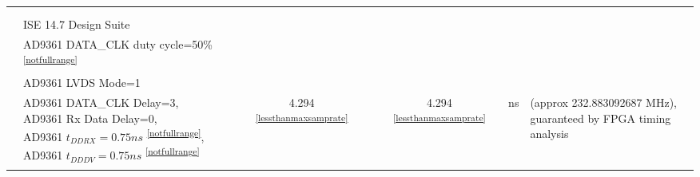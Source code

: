 \documentclass{article}
\begin{document}
\begin{scriptsize}
\begin{longtable}{|c|l|c|c|c|c|l|}
\\
                          &                                      &                                & &                                &                      & \\
                          &                                      &                                & &                                &                      & \\
                          & \multirow{1}{*}{\parbox{5.8 cm}{\hspace*{2mm} ISE 14.7 Design Suite}} & & & & & \\
                          & \multirow{1}{*}{\parbox{5.8 cm}{\hspace*{6mm} AD9361 DATA\_CLK duty cycle=50\% \textsuperscript{\ref{notfullrange}} }} & & & & & \\
                          & \multirow{1}{*}{\parbox{5.8 cm}{\hspace*{9mm} AD9361 LVDS Mode=1}} & & & & & \\
                          & \multirow{4}{*}{\parbox{5.8 cm}{\hspace*{12mm}AD9361 DATA\_CLK Delay=3, \\\hspace*{12mm}AD9361 Rx Data Delay=0, \\ \hspace*{12mm}AD9361 $t_{DDRX}=0.75 ns$ \textsuperscript{\ref{notfullrange}}, \\ \hspace*{12mm}AD9361 $t_{DDDV}=0.75ns$ \textsuperscript{\ref{notfullrange}} }} & \multirow{4}{*}{4.294 \textsuperscript{\ref{lessthanmaxsamprate}}} & & \multirow{4}{*}{4.294 \textsuperscript{\ref{lessthanmaxsamprate}}} & \multirow{4}{*}{ns} &
\multirow{4}{*}{\parbox{3.8cm}{(approx 232.883092687 MHz), \\ guaranteed by FPGA timing analysis}}
\\
                          &                                      &                                & &                                &                      & \\
                          &                                      &                                & &                                &                      & \\
                          &                                      &                                & &                                &                      & \\
                          &                                      &                                & &                                &                      & \\

\end{longtable}
\end{scriptsize}
\end{document}

